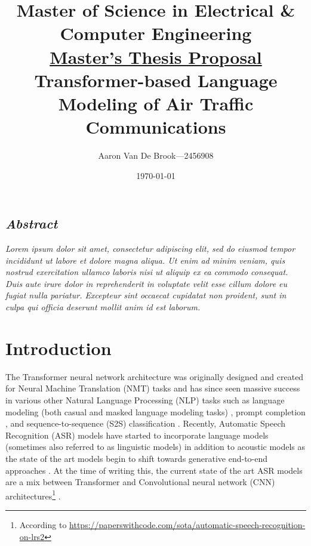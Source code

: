 \documentclass{article}
\title{
    Master of Science in Electrical \& Computer Engineering\\
    \underline{Master's Thesis Proposal}\\
    Transformer-based Language Modeling of Air Traffic Communications
}
\author{Aaron Van De Brook---2456908}
\date{\today}
\begin{document}
    \maketitle

    \begin{center}
        \section*{\textit{Abstract}}
        \textit{Lorem ipsum dolor sit amet, consectetur adipiscing elit, sed do eiusmod tempor incididunt ut labore et dolore magna aliqua. Ut enim ad minim veniam, quis nostrud exercitation ullamco laboris nisi ut aliquip ex ea commodo consequat. Duis aute irure dolor in reprehenderit in voluptate velit esse cillum dolore eu fugiat nulla pariatur. Excepteur sint occaecat cupidatat non proident, sunt in culpa qui officia deserunt mollit anim id est laborum.}
    \end{center}

    \section{Introduction}
        The Transformer neural network architecture was originally designed and created for Neural Machine Translation (NMT) tasks \cite{vaswani_attention_2017} and has since seen massive success in various other Natural Language Processing (NLP) tasks such as language modeling (both casual and masked language modeling tasks) \cite{devlin_bert_2019}, prompt completion \cite{radford_improving_2018}, and sequence-to-sequence (S2S) classification \cite{lewis_bart_2019}.
        Recently, Automatic Speech Recognition (ASR) models have started to incorporate language models \cite{badrinath_automatic_2022} (sometimes also referred to as linguistic models) in addition to acoustic models \cite{li2019jasper} as the state of the art models begin to shift towards generative end-to-end approaches \cite{hannun2014deep}.
        At the time of writing this, the current state of the art ASR models are a mix between Transformer and Convolutional neural network (CNN) architectures\footnote{According to \url{https://paperswithcode.com/sota/automatic-speech-recognition-on-lrs2}} \cite{baevski2020wav2vec}.
\end{document}
